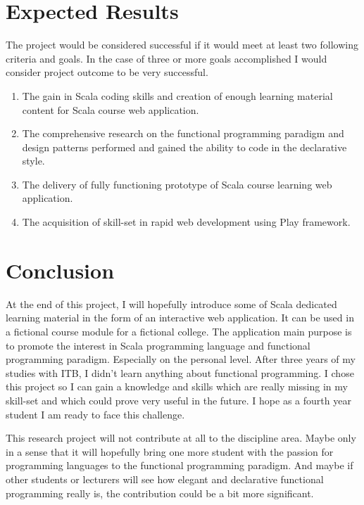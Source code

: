 \documentclass[12pt,twoside,a4paper]{report}
\begin{document}
\section{Expected Results}\label{1.8}
The project would be considered successful if it would meet at least two following criteria and goals. In the case of three or more goals accomplished I would consider project outcome to be very successful.
\begin{enumerate}\itemsep1pt \parskip0pt 
\item The gain in Scala coding skills and creation of enough learning material content for Scala course web application.
\item The comprehensive research on the functional programming paradigm and design patterns performed and gained the ability to code in the declarative style.
\item The delivery of fully functioning prototype of Scala course learning web application.
\item The acquisition of skill-set in rapid web development using Play framework.
\end{enumerate}

\section{Conclusion}\label{1.9}
At the end of this project, I will hopefully introduce some of Scala dedicated learning material in the form of an interactive web application. It can be used in a fictional course module for a fictional college. The application main purpose is to promote the interest in Scala programming language and functional programming paradigm. Especially on the personal level. After three years of my studies with ITB, I didn't learn anything about functional programming. I chose this project so I can gain a knowledge and skills which are really missing in my skill-set and which could prove very useful in the future. I hope as a fourth year student I am ready to face this challenge.\par
This research project will not contribute at all to the discipline area. Maybe only in a sense that it will hopefully bring one more student with the passion for programming languages to the functional programming paradigm. And maybe if other students or lecturers will see how elegant and declarative functional programming really is, the contribution could be a bit more significant.
\end{document}
